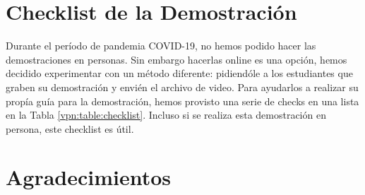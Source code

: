 \section{Checklist de la Demostración}

Durante el período de pandemia COVID-19, no hemos podido hacer las demostraciones en personas. Sin embargo hacerlas online es una opción, hemos decidido experimentar con un método diferente: pidiendóle a los estudiantes que graben su demostración y envién el archivo de video. Para ayudarlos a realizar su propía guía para la demostración, hemos provisto una serie de checks en una lista en la Tabla \ref{vpn:table:checklist}. Incluso si se realiza esta demostración en persona, este checklist es útil.




\section*{Agradecimientos}







